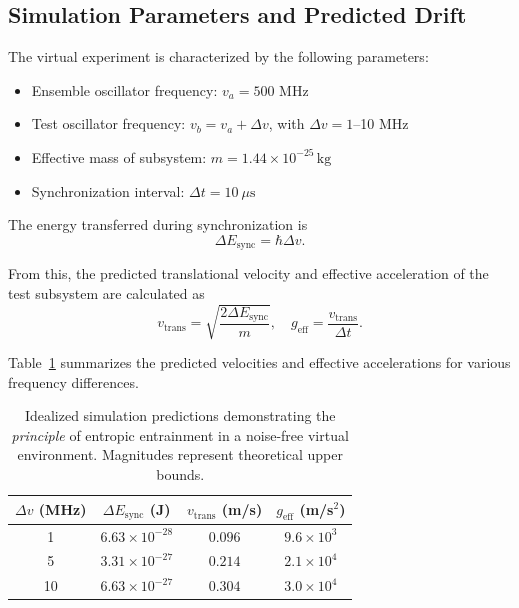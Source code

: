 \documentclass[%
 reprint,
 amsmath,amssymb,
 aps,
 prb,
]{revtex4-2}
\numberwithin{equation}{section}
\begin{document}
\subsection{Simulation Parameters and Predicted Drift}

The virtual experiment is characterized by the following parameters:

\begin{itemize}
\item Ensemble oscillator frequency: $v_a = 500$ MHz
\item Test oscillator frequency: $v_b = v_a + \Delta v$, with $\Delta v = 1$--10 MHz
\item Effective mass of subsystem: $m = 1.44\times10^{-25}\,\mathrm{kg}$
\item Synchronization interval: $\Delta t = 10~\mu\mathrm{s}$
\end{itemize}

The energy transferred during synchronization is
\begin{equation}
\Delta E_\text{sync} = \hbar \Delta v.
\end{equation}

From this, the predicted translational velocity and effective acceleration of the test subsystem are calculated as
\begin{equation}
v_\text{trans} = \sqrt{\frac{2 \Delta E_\text{sync}}{m}}, \quad
g_\text{eff} = \frac{v_\text{trans}}{\Delta t}.
\end{equation}

Table~\ref{tab:idealized_predictions} summarizes the predicted velocities and effective accelerations for various frequency differences.

\begin{table}[t!]
\centering
\begin{tabular*}{\columnwidth}{@{\extracolsep{\fill}}cccc@{}}
\toprule
$\Delta v$ (MHz) & $\Delta E_\text{sync}$ (J) & $v_\text{trans}$ (m/s) & $g_\text{eff}$ (m/s$^2$) \\
\midrule
1  & $6.63\times10^{-28}$ & $0.096$ & $9.6\times10^3$ \\
5  & $3.31\times10^{-27}$ & $0.214$ & $2.1\times10^4$ \\
10 & $6.63\times10^{-27}$ & $0.304$ & $3.0\times10^4$ \\
\bottomrule
\end{tabular*}
\caption{\justifying Idealized simulation predictions demonstrating the \textit{principle} of entropic entrainment in a noise-free virtual environment. Magnitudes represent theoretical upper bounds.}
\label{tab:idealized_predictions}
\end{table}
\end{document}
